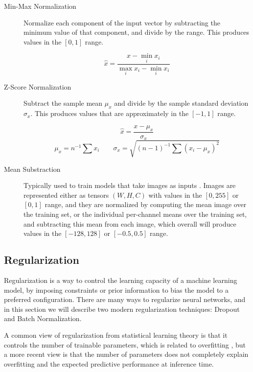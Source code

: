 \begin{description}
	\item[Min-Max Normalization] Normalize each component of the input vector by subtracting the minimum value of that component, and divide by the range. This produces values in the $[0, 1]$ range.
    
		\begin{equation}
			\hat{x} = \frac{x - \min_i x_i}{\max_i x_i - \min_i x_i}
		\end{equation}
		
	\item[Z-Score Normalization] Subtract the sample mean $\mu_x$ and divide by the sample standard deviation $\sigma_x$. This produces values that are approximately in the $[-1, 1]$ range.
    
		\begin{equation}
			\hat{x} = \frac{x - \mu_x}{\sigma_x}
		\end{equation}
        \begin{equation}
            \mu_x = n^{-1} \sum x_i \qquad \sigma_x = \sqrt{(n-1)^{-1} \sum (x_i - \mu_x)^2}
        \end{equation}
        
    \item[Mean Substraction] Typically used to train models that take images as inputs \cite{krizhevsky2012imagenet}. Images are represented either as tensors $(W, H, C)$ with values in the $[0, 255]$ or $[0, 1]$ range, and they are normalized by computing the mean image over the training set, or the individual per-channel means over the training set, and subtracting this mean from each image, which overall will produce values in the $[-128, 128]$ or $[-0.5, 0.5]$ range.
\end{description}

\subsection{Regularization}

Regularization is a way to control the learning capacity of a machine learning model, by imposing constraints or prior information to bias the model to a preferred configuration. There are many ways to regularize neural networks, and in this section we will describe two modern regularization techniques: Dropout and Batch Normalization.

A common view of regularization from statistical learning theory is that it controls the number of trainable parameters, which is related to overfitting \cite[-5em]{bishop2006pattern}, but a more recent view \cite[-2em]{luo2018understanding} is that the number of parameters does not completely explain overfitting and the expected predictive performance at inference time.

